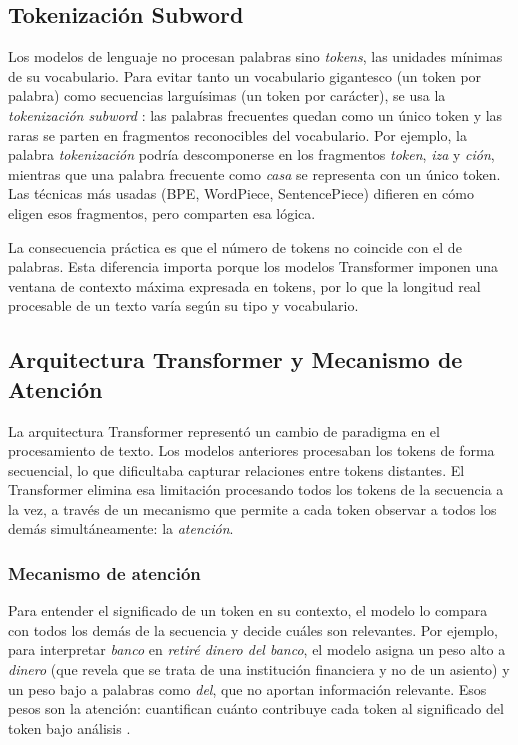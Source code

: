 \subsection{Tokenización Subword}
\label{subsec:tokenizacion}

Los modelos de lenguaje no procesan palabras sino \textit{tokens}, las unidades mínimas de su vocabulario. Para evitar tanto un vocabulario gigantesco (un token por palabra) como secuencias larguísimas (un token por carácter), se usa la \textit{tokenización subword} \parencite{sennrich_2016_bpe}: las palabras frecuentes quedan como un único token y las raras se parten en fragmentos reconocibles del vocabulario. Por ejemplo, la palabra \textit{tokenización} podría descomponerse en los fragmentos \textit{token}, \textit{iza} y \textit{ción}, mientras que una palabra frecuente como \textit{casa} se representa con un único token. Las técnicas más usadas (BPE, WordPiece, SentencePiece) difieren en cómo eligen esos fragmentos, pero comparten esa lógica.

La consecuencia práctica es que el número de tokens no coincide con el de palabras. Esta diferencia importa porque los modelos Transformer imponen una ventana de contexto máxima expresada en tokens, por lo que la longitud real procesable de un texto varía según su tipo y vocabulario.

\subsection{Arquitectura Transformer y Mecanismo de Atención}
\label{subsec:transformer}

La arquitectura Transformer \parencite{vaswani_2017_attention} representó un cambio de paradigma en el procesamiento de texto. Los modelos anteriores procesaban los tokens de forma secuencial, lo que dificultaba capturar relaciones entre tokens distantes. El Transformer elimina esa limitación procesando todos los tokens de la secuencia a la vez, a través de un mecanismo que permite a cada token observar a todos los demás simultáneamente: la \textit{atención}.

\subsubsection*{Mecanismo de atención}

Para entender el significado de un token en su contexto, el modelo lo compara con todos los demás de la secuencia y decide cuáles son relevantes. Por ejemplo, para interpretar \textit{banco} en \textit{retiré dinero del banco}, el modelo asigna un peso alto a \textit{dinero} (que revela que se trata de una institución financiera y no de un asiento) y un peso bajo a palabras como \textit{del}, que no aportan información relevante. Esos pesos son la atención: cuantifican cuánto contribuye cada token al significado del token bajo análisis \parencite{vaswani_2017_attention}.

